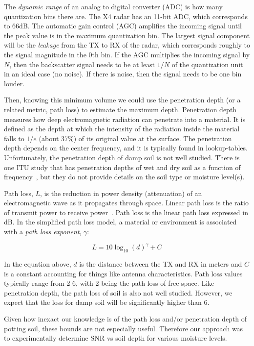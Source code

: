 \documentclass[12pt]{article}
\begin{document}
The \emph{dynamic range} of an analog to digital converter (ADC) is
how many quantization bins there are. The X4 radar has an 11-bit ADC,
which corresponds to 66dB. The automatic gain control (AGC) amplifies
the incoming signal until the peak value is in the maximum
quantization bin. The largest signal component will be the
\emph{leakage} from the TX to RX of the radar, which corresponds
roughly to the signal magnitude in the 0th bin. If the AGC multiplies
the incoming signal by $N$, then the backscatter signal needs to be at
least $1/N$ of the quantization unit in an ideal case (no noise). If
there is noise, then the signal needs to be one bin louder.

Then, knowing this minimum volume we could use the penetration depth
(or a related metric, path loss) to estimate the maximum
depth. Penetration depth measures how deep electromagnetic radiation
can penetrate into a material. It is defined as the depth at which the
intensity of the radiation inside the material falls to $1/e$ (about
37\%) of its original value at the surface. The penetration depth
depends on the center frequency, and it is typically found in
lookup-tables. Unfortunately, the penetration depth of damp soil is
not well studied. There is one ITU study that has penetration depths
of wet and dry soil as a function of
frequency~\cite{penetrationDepth}, but they do not provide details on
the soil type or moisture level(s).

Path loss, $L$, is the reduction in power density (attenuation) of an
electromagnetic wave as it propagates through space. Linear path loss
is the ratio of transmit power to receive power~\cite{goldsmith}. Path
loss is the linear path loss expressed in dB. In the simplified path
loss model, a material or environment is associated with a \emph{path
  loss exponent}, $\gamma$:

\begin{equation}
  L = 10\log_{10}(d)^\gamma + C
\end{equation}

In the equation above, $d$ is the distance between the TX and RX in
meters and $C$ is a constant accounting for things like antenna
characteristics. Path loss values typically range from 2-6, with 2
being the path loss of free space. Like penetration depth, the path
loss of soil is also not well studied. However, we expect that the
loss for damp soil will be significantly higher than 6.

Given how inexact our knowledge is of the path loss and/or penetration
depth of potting soil, these bounds are not especially
useful. Therefore our approach was to experimentally determine SNR vs
soil depth for various moisture levels. 
\end{document}
